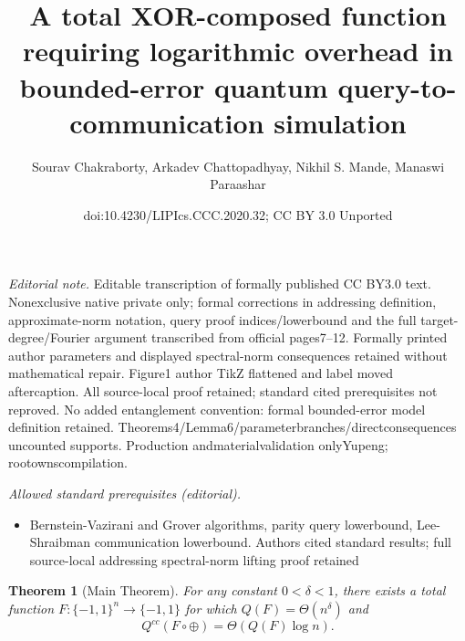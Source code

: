\documentclass[10pt,a4paper]{article}
\title{A total XOR-composed function requiring logarithmic overhead in bounded-error quantum query-to-communication simulation}
\author{Sourav Chakraborty, Arkadev Chattopadhyay, Nikhil S. Mande, Manaswi Paraashar}
\date{doi:10.4230/LIPIcs.CCC.2020.32; CC BY 3.0 Unported}
\newtheorem{theorem}{Theorem}
\theoremstyle{definition}
\newcommand{\bra}[1]{\{#1\}}
\newcommand{\pmone}{\bra{-1,1}}
\begin{document}
\maketitle
\noindent\textit{Editorial note.} Editable transcription of formally published CC BY3.0 text. Nonexclusive native private only; formal corrections in addressing definition, approximate-norm notation, query proof indices/lowerbound and the full target-degree/Fourier argument transcribed from official pages7–12. Formally printed author parameters and displayed spectral-norm consequences retained without mathematical repair. Figure1 author TikZ flattened and label moved aftercaption. All source-local proof retained; standard cited prerequisites not reproved. No added entanglement convention: formal bounded-error model definition retained. Theorems4/Lemma6/parameterbranches/directconsequences uncounted supports. Production andmaterialvalidation onlyYupeng; rootownscompilation.\par\medskip
\noindent\textit{Allowed standard prerequisites (editorial).}\begin{itemize}
\item Bernstein-Vazirani and Grover algorithms, parity query lowerbound, Lee-Shraibman communication lowerbound. Authors cited standard results; full source-local addressing spectral-norm lifting proof retained
\end{itemize}\medskip
\setcounter{theorem}{2}
\begin{theorem}[Main Theorem]\label{thm: extmain}
For any constant $0 < \delta < 1$, there exists a total function $F : \pmone^n \to \pmone$ for which $Q(F) = \Theta(n^{\delta})$ and 
\[
Q^{cc}(F \circ \oplus) = \Theta(Q(F) \log n).
\]
\end{theorem}
\end{document}
